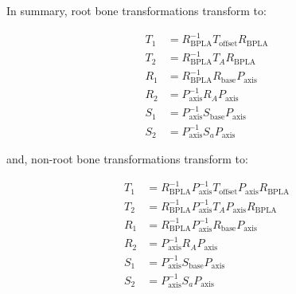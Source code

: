 \documentclass{article}
\begin{document}
In summary, root bone transformations transform to:
\begin{tcolorbox}
\begin{align}
T_1 &= R_\mathrm{BPLA}^{-1} T_\mathrm{offset} R_\mathrm{BPLA}\\
T_2 &= R_\mathrm{BPLA}^{-1} T_A R_\mathrm{BPLA}  \\
R_1 &= R_\mathrm{BPLA}^{-1} R_\mathrm{base} P_\mathrm{axis}\\
R_2 &= P_\mathrm{axis}^{-1} R_A P_\mathrm{axis}\\
S_1 &= P_\mathrm{axis}^{-1} S_\mathrm{base} P_\mathrm{axis}\\
S_2 &= P_\mathrm{axis}^{-1} S_a P_\mathrm{axis}
\end{align}
\end{tcolorbox}
and, non-root bone transformations transform to:
\begin{tcolorbox}
\begin{align}
T_1 &= R_\mathrm{BPLA}^{-1} P_\mathrm{axis}^{-1} T_\mathrm{offset} P_\mathrm{axis} R_\mathrm{BPLA}\\
T_2 &= R_\mathrm{BPLA}^{-1} P_\mathrm{axis}^{-1} T_A P_\mathrm{axis} R_\mathrm{BPLA}  \\
R_1 &= R_\mathrm{BPLA}^{-1} P_\mathrm{axis}^{-1}  R_\mathrm{base} P_\mathrm{axis}\\
R_2 &= P_\mathrm{axis}^{-1} R_A P_\mathrm{axis}\\
S_1 &= P_\mathrm{axis}^{-1} S_\mathrm{base} P_\mathrm{axis}\\
S_2 &= P_\mathrm{axis}^{-1} S_a P_\mathrm{axis}
\end{align}
\end{tcolorbox}


\iffalse

\subsubsection{Deformable Meshes}

\begin{equation}
v' = \sum_i w_i A_i v
\end{equation}

\begin{equation}
v' =  A_\mathrm{M} \sum_i w_i A_i M_\mathrm{BPM} v_\mathrm{GFS}
\end{equation}

\begin{align}
v &= M_\mathrm{mesh} v_\mathrm{GFS}\\
  &= \left( \prod_i  T_i R_i S_i \right) v_\mathrm{GFS}
\end{align}

\fi
\end{document}
